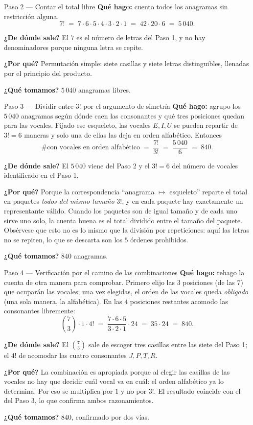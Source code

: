 \documentclass[11pt]{article}
\begin{document}
\begin{paso}{Paso 2 --- Contar el total libre}
\textbf{Qué hago:} cuento todos los anagramas sin restricción alguna.
\[
7! \;=\; 7\cdot6\cdot5\cdot4\cdot3\cdot2\cdot1 \;=\; 42\cdot 20\cdot 6 \;=\; 5\,040.
\]

\textbf{¿De dónde sale?} El $7$ es el número de letras del Paso 1, y no hay denominadores porque ninguna
letra se repite.

\textbf{¿Por qué?} Permutación simple: siete casillas y siete letras distinguibles, llenadas por el
principio del producto.

\textbf{¿Qué tomamos?} $5\,040$ anagramas libres.
\end{paso}

\begin{paso}{Paso 3 --- Dividir entre $3!$ por el argumento de simetría}
\textbf{Qué hago:} agrupo los $5\,040$ anagramas según dónde caen las consonantes y qué tres posiciones
quedan para las vocales. Fijado ese esqueleto, las vocales $E,I,U$ se pueden repartir de $3!=6$ maneras y
solo una de ellas las deja en orden alfabético. Entonces
\[
\#\text{con vocales en orden alfabético} \;=\; \frac{7!}{3!} \;=\; \frac{5\,040}{6} \;=\; 840.
\]

\textbf{¿De dónde sale?} El $5\,040$ viene del Paso 2 y el $3!=6$ del número de vocales identificado en el
Paso 1.

\textbf{¿Por qué?} Porque la correspondencia ``anagrama $\mapsto$ esqueleto'' reparte el total en paquetes
\emph{todos del mismo tamaño} $3!$, y en cada paquete hay exactamente un representante válido. Cuando los
paquetes son de igual tamaño y de cada uno sirve uno solo, la cuenta buena es el total dividido entre el
tamaño del paquete. Obsérvese que esto no es lo mismo que la división por repeticiones: aquí las letras no
se repiten, lo que se descarta son los $5$ órdenes prohibidos.

\textbf{¿Qué tomamos?} $840$ anagramas.
\end{paso}

\begin{paso}{Paso 4 --- Verificación por el camino de las combinaciones}
\textbf{Qué hago:} rehago la cuenta de otra manera para comprobar. Primero elijo las $3$ posiciones (de las
$7$) que ocuparán las vocales; una vez elegidas, el orden de las vocales queda \emph{obligado} (una sola
manera, la alfabética). En las $4$ posiciones restantes acomodo las consonantes libremente:
\[
\binom{7}{3}\cdot 1\cdot 4! \;=\; \frac{7\cdot6\cdot5}{3\cdot2\cdot1}\cdot 24 \;=\; 35\cdot 24 \;=\; 840.
\]

\textbf{¿De dónde sale?} El $\binom{7}{3}$ sale de escoger tres casillas entre las siete del Paso 1; el $4!$
de acomodar las cuatro consonantes $J,P,T,R$.

\textbf{¿Por qué?} La combinación es apropiada porque al elegir las casillas de las vocales no hay que
decidir cuál vocal va en cuál: el orden alfabético ya lo determina. Por eso se multiplica por $1$ y no por
$3!$. El resultado coincide con el del Paso 3, lo que confirma ambos razonamientos.

\textbf{¿Qué tomamos?} $840$, confirmado por dos vías.
\end{paso}
\end{document}
